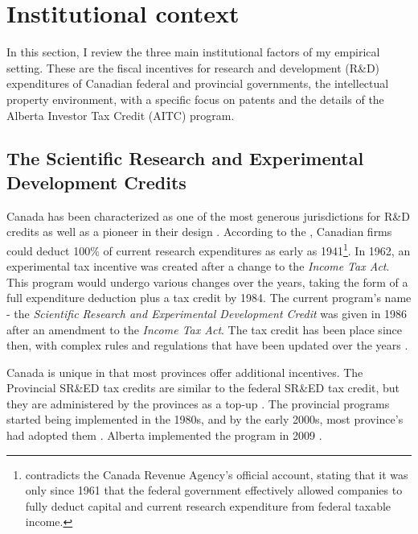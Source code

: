 \documentclass[../main.tex]{subfiles}
\begin{document}
\section{Institutional context}
\label{sec:institutional_background}

In this section, I review the three main institutional factors of my empirical setting. These are the fiscal incentives for research and development (R\&D) expenditures of Canadian federal and provincial governments, the intellectual property environment, with a specific focus on patents and the details of the Alberta Investor Tax Credit (AITC) program.

\subsection{The Scientific Research and Experimental Development Credits}

Canada has been characterized as one of the most generous jurisdictions for R\&D credits \parencite{mckenzie08} as well as a pioneer in their design \parencite{mansfield_switzer85a}. According to the \textcite{canadarevenueagency23}, Canadian firms could deduct 100\% of current research expenditures as early as 1941\footnote{\textcite{mansfield_switzer85a} contradicts the Canada Revenue Agency's official account, stating that it was only since 1961 that the federal government effectively allowed companies to fully deduct capital and current research expenditure from federal taxable income.}. In 1962, an experimental tax incentive was created after a change to the \textit{Income Tax Act}. This program would undergo various changes over the years, taking the form of a full expenditure deduction plus a tax credit by 1984. The current program's name - the \textit{Scientific Research and Experimental Development Credit} was given in 1986 after an amendment to the \textit{Income Tax Act}. The tax credit has been place since then, with complex rules and regulations that have been updated over the years \parencite{canadarevenueagency15}.

Canada is unique in that most provinces offer additional incentives. The Provincial SR\&ED tax credits are similar to the federal SR\&ED tax credit, but they are administered by the provinces as a top-up \parencite{warda00}. The provincial programs started being implemented in the 1980s, and by the early 2000s, most province's had adopted them \parencite{warda98,mckenzie05}. Alberta implemented the program in 2009 \parencite{brouillete13}.
\end{document}
